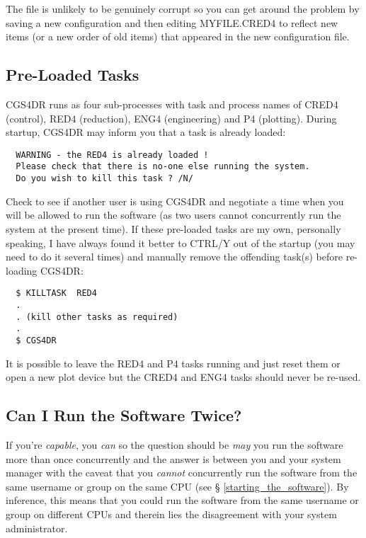{The file is unlikely to be genuinely corrupt so you can get around the problem 
by saving a new configuration and then editing {\sf MYFILE.CRED4} to reflect 
new items (or a new order of old items) that appeared in the new configuration 
file. 

\subsection{Pre-Loaded Tasks}
\label{preloaded_tasks}

CGS4DR runs as four sub-processes with task and process names of {\sf CRED4} 
(control), {\sf RED4} (reduction), {\sf ENG4} (engineering) and {\sf P4} 
(plotting). During startup, CGS4DR may inform you that a task is already 
loaded:

\begin{verbatim}
  WARNING - the RED4 is already loaded !
  Please check that there is no-one else running the system.
  Do you wish to kill this task ? /N/ 
\end{verbatim}

Check to see if another user is using CGS4DR and negotiate a time when
you will  be allowed to run the software (as two users cannot concurrently
run the system at the present time). If these pre-loaded tasks are my
own, personally speaking, I have always found it better to CTRL/Y out of 
the startup (you may need to do it several times) and manually remove the 
offending task(s) before re-loading CGS4DR:

\begin{verbatim}
  $ KILLTASK  RED4
  .
  . (kill other tasks as required)
  .
  $ CGS4DR
\end{verbatim}

It is possible to leave the {\sf RED4} and {\sf P4} tasks running and just
reset them or open a new plot device but the {\sf CRED4} and {\sf ENG4}
tasks should never be re-used.

\subsection{Can I Run the Software Twice?}
\label{can_I_run_the_software_twice}

If you're {\em capable}, you {\em can} so the question should be {\em may} you
run the software more than once concurrently and the answer is between you
and your system manager with the caveat that you {\em cannot} concurrently
run the software from the same username or group on the same CPU (see \S 
\ref{starting_the_software}). By inference, this means that you could run 
the software from the same username or group on different CPUs and therein 
lies the disagreement with your system administrator.

}
